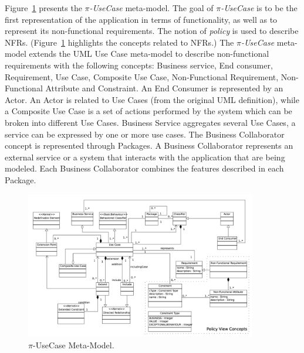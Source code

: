 \documentclass[12pt,twoside]{article}
\theoremstyle{plain}
\theoremstyle{plain}
\begin{document}
\begin{multicols}{2}
Figure~\ref{fig:CIM:usecasemetamodel} presents the \textit{$\pi$-UseCase} meta-model.
The goal of \textit{$\pi$-UseCase}  is to be the first representation of the application in terms of functionality, as well as to represent its non-func\-tion\-al requirements.
The notion of \textit{policy} is used to describe NFRs.
(Figure~\ref{fig:CIM:usecasemetamodel} highlights the concepts related to NFRs.)
The \textit{$\pi$-UseCase} meta-model extends the UML Use Case meta-model to describe non-functional requirements with  the following  concepts:  {\sc Business service}, {\sc End consumer}, {\sc Requirement}, {\sc Use Case}, {\sc Composite Use Case}, {\sc Non-\-Func\-tion\-al Requirement}, {\sc Non-Functional} {\sc At\-tri\-bute} and {\sc Constraint}.
An {\sc End Consumer} is represented by an {\sc Actor}.
An  {\sc Actor} is related to {\sc Use Cases} (from the original UML definition), while a {\sc  Composite Use Case} is a set of actions performed by the system which can be broken into different {\sc Use Cases}.
{\sc  Business Service} aggregates several {\sc Use Cases},  a service can be expressed by one or more use cases.
 The {\sc Business Collaborator} concept is represented  through {\sc Packages}.
A {\sc Business Collaborator} represents an external service or a system that interacts with the application that are being modeled.
Each {\sc Business Collaborator} combines the features described in each  {\sc Package}.

 \begin{figure}
\center
\includegraphics[width=0.9\textwidth]{UseCaseMetaModel.pdf}
\caption{\label{fig:CIM:usecasemetamodel} $\pi$-UseCase Meta-Model.}
\end{figure}



\end{multicols}
\end{document}
